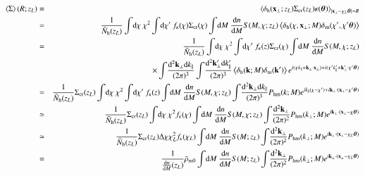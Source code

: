 \documentclass[onecolumn,notitlepage,showpacs,amsmath,amssymb,prd,floatfix]{revtex4-1}
\def\ave#1{\left\langle #1 \right\rangle}
\newcommand{\bx}{{\bf x}}
\newcommand{\bk}{{\bf k}}
\newcommand{\btheta}{{\bm{\theta}}}
\newcommand{\dr}{\mathrm{d}}
\newcommand{\deltam}{\delta_{\mathrm{m}}}
\newcommand{\deltah}{\delta_{\mathrm{h}}}
\newcommand{\phm}{P_{\mathrm{hm}}}
\newcommand{\bh}{\mathrm{h}}
\newcommand{\bnh}{\frac{\dr n}{\dr M}}
\newcommand{\sigmacr}{\Sigma_{\rm cr}}
\begin{document}
\begin{eqnarray}
 \ave{\Sigma}(R;z_L)&\equiv&
  \ave{\deltah(\bx_\perp;z_L)\sigmacr(z_L)\kappa(\btheta)}_{|\bx_\perp-\chi_L
  \btheta|=R}\nonumber\\
 &=&\frac{1}{\bar{N}_\bh(z_L)}\int\!\dr\chi~\chi^2\int\!\dr\chi'~f_\kappa(\chi)\sigmacr(\chi)
  \int\!\dr M~\frac{\dr n}{\dr M}S(M,\chi;z_L)
  \ave{\deltah(\chi,\bx_\perp;M)\deltam(\chi',\chi'\btheta)}\nonumber\\
 &=&\frac{1}{\bar{N}_\bh(z_L)}\int\!\dr\chi~\chi^2\int\!\dr\chi'~f_\kappa(z)\sigmacr(\chi)
  \int\!\dr M~\frac{\dr n}{\dr M}S(M,\chi;z_L)\nonumber\\
 &&\hspace{4em}\times
  \int\!\frac{\dr^2\bk_\perp \dr k_\parallel}{(2\pi)^3}
  \int\!\frac{\dr^2\bk'_\perp \dr k'_\parallel}{(2\pi)^3}
  \ave{\deltah(\bk;M)\deltam(\bk')}
e^{i(\chi k_\parallel+\bk_\perp\cdot\bx_\perp)+i(\chi'k'_\parallel+\bk'_\perp\cdot\chi'\btheta)}
\nonumber\\
 &=&\frac{1}{\bar{N}_\bh(z_L)}\sigmacr(z_L)\int\!\dr\chi~\chi^2\int\!\dr\chi'~f_\kappa(z)
  \int\!\dr M~\frac{\dr n}{\dr M}S(M,\chi;z_L)
  \int\!\frac{\dr^2\bk_\perp \dr k_\parallel}{(2\pi)^3}
\phm(k;M)
e^{ik_\parallel(\chi-\chi')+i\bk_\perp\cdot(\bx_\perp-\chi'\btheta)}
\nonumber\\
 &\simeq&
  \frac{1}{\bar{N}_\bh(z_L)}\sigmacr(z_L)\int\!\dr\chi~\chi^2f_\kappa(\chi)
  \int\!\dr M~\frac{\dr n}{\dr M}S(M,\chi;z_L)
  \int\!\frac{\dr^2\bk_\perp}{(2\pi)^2}
\phm(k_\perp;M)
e^{i\bk_\perp\cdot(\bx_\perp-\chi\btheta)}
\nonumber\\
 &\simeq&   \frac{1}{\bar{N}_\bh(z_L)}\sigmacr(z_L)\Delta\chi
\chi_L^2f_\kappa(\chi_L)
  \int\!\dr M~\frac{\dr n}{\dr M}S(M;z_L)
  \int\!\frac{\dr^2\bk_\perp }{(2\pi)^2}
\phm(k_\perp;M)
e^{i\bk_\perp\cdot(\bx_\perp-\chi_L\btheta)}\nonumber\\
 &=&\frac{1}{\bnh(z_L)}\bar{\rho}_{\rm m0}
  \int\!\dr M~\frac{\dr n}{\dr M}S(M;z_L)
  \int\!\frac{\dr^2\bk_\perp }{(2\pi)^2}
\phm(k_\perp;M)
e^{i\bk_\perp\cdot(\bx_\perp-\chi_L\btheta)}
\end{eqnarray}
%
\end{document}
